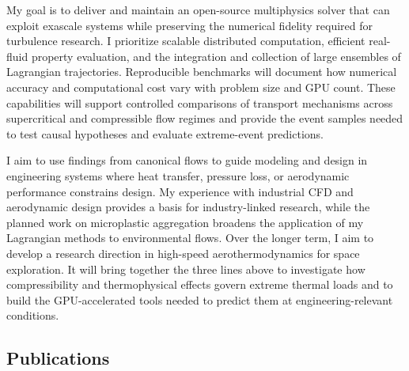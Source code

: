 \documentclass[11pt]{article}
\begin{document}
\begin{enumerate}[label=\textbf{\arabic*.}, leftmargin=*, itemsep=8pt]
	My goal is to deliver and maintain an open-source multiphysics solver that can exploit
	exascale systems while preserving the numerical fidelity required for turbulence research. I prioritize scalable distributed computation, efficient real-fluid property evaluation, and the integration and collection of large ensembles of Lagrangian trajectories. Reproducible benchmarks will	document how numerical accuracy and computational cost vary with problem
	size and GPU count. These capabilities will support controlled comparisons of transport mechanisms across supercritical and compressible flow regimes and provide the event samples needed to test causal hypotheses and evaluate extreme-event predictions.
	
\end{enumerate}

I aim to use findings from canonical flows to guide modeling and design in engineering systems where heat transfer, pressure loss, or aerodynamic performance constrains design. My experience with industrial CFD and aerodynamic design provides a basis for industry-linked research, while the
planned work on microplastic aggregation broadens the application of my Lagrangian methods to environmental flows. Over the longer term, I aim to develop a research direction in high-speed aerothermodynamics for space exploration. It will bring together the three lines above to investigate how compressibility and thermophysical effects govern extreme thermal loads
and to build the GPU-accelerated tools needed to predict them at engineering-relevant conditions.


\subsection{Publications}\label{sec:publications}
\end{document}
